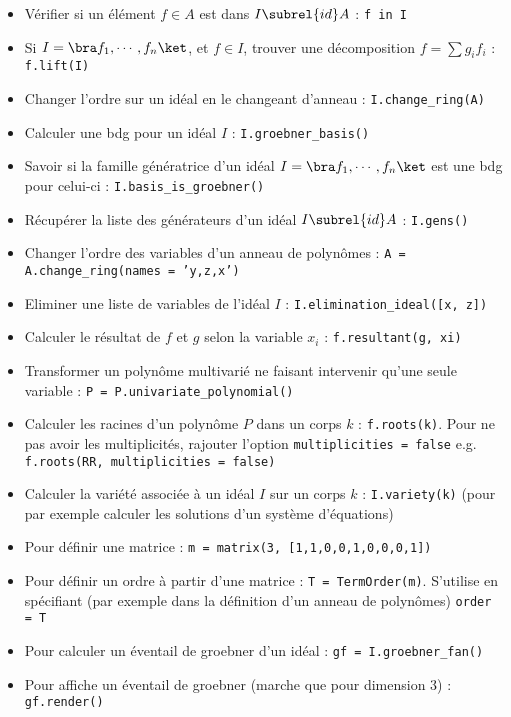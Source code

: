 \begin{itemize}
            \item Vérifier si un élément $f \in A$ est dans $I \subrel{id} A$ : \texttt{f in I}
            \item Si $I = \bra f_1, \cdots, f_n \ket$, et $f \in I$, trouver une décomposition $f = \sum g_if_i$ : \texttt{f.lift(I)}
            \item Changer l'ordre sur un idéal en le changeant d'anneau : \texttt{I.change_ring(A)}
            \item Calculer une bdg pour un idéal $I$ : \texttt{I.groebner_basis()}
            \item Savoir si la famille génératrice d'un idéal $I = \bra f_1, \cdots, f_n \ket$ est une bdg pour celui-ci : \texttt{I.basis_is_groebner()}
            \item Récupérer la liste des générateurs d'un idéal $I \subrel{id} A$ : \texttt{I.gens()}
            \item Changer l'ordre des variables d'un anneau de polynômes : \texttt{A = A.change_ring(names = 'y,z,x')}
            \item Eliminer une liste de variables de l'idéal $I$ : \texttt{I.elimination_ideal([x, z])}
            \item Calculer le résultat de $f$ et $g$ selon la variable $x_i$ : \texttt{f.resultant(g, xi)}
            \item Transformer un polynôme multivarié ne faisant intervenir qu'une seule variable : \texttt{P = P.univariate_polynomial()}
            \item Calculer les racines d'un polynôme $P$ dans un corps $k$ : \texttt{f.roots(k)}. Pour ne pas avoir les multiplicités, rajouter l'option \texttt{multiplicities = false} e.g. \linebreak \texttt{f.roots(RR, multiplicities = false)}
            \item Calculer la variété associée à un idéal $I$ sur un corps $k$ : \texttt{I.variety(k)} (pour par exemple calculer les solutions d'un système d'équations)
            \item Pour définir une matrice : \texttt{m = matrix(3, [1,1,0,0,1,0,0,0,1])}
            \item Pour définir un ordre à partir d'une matrice : \texttt{T = TermOrder(m)}. S'utilise en spécifiant (par exemple dans la définition d'un anneau de polynômes) \texttt{order = T}
            \item Pour calculer un éventail de groebner d'un idéal : \texttt{gf = I.groebner_fan()}
            \item Pour affiche un éventail de groebner (marche que pour dimension $3$) : \texttt{gf.render()}
        \end{itemize}
